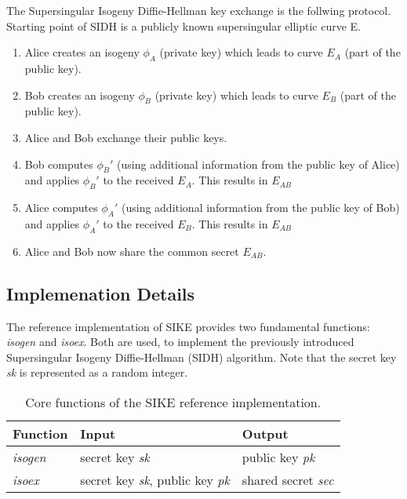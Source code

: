 The Supersingular Isogeny Diffie-Hellman key exchange is the follwing protocol.
Starting point of SIDH is a publicly known supersingular elliptic curve E. 

\begin{enumerate}
\item Alice creates an isogeny $\phi_A$ (private key) which leads to curve $E_A$ (part of the public key).
\item Bob creates an isogeny $\phi_B$ (private key) which leads to curve $E_B$ (part of the public key).
\item Alice and Bob exchange their public keys.
\item Bob computes $\phi_B'$ (using additional information from the public key of Alice) and applies $\phi_B'$ to the received $E_A$. This results in $E_{AB}$
\item Alice computes $\phi_A'$ (using additional information from the public key of Bob) and applies $\phi_A'$ to the received $E_B$. This results in $E_{AB}$
\item Alice and Bob now share the  common secret $E_{AB}$.
\end{enumerate}

\subsection{Implemenation Details}

The reference implementation of SIKE \parencite{sike2020spec} provides two fundamental functions: \textit{isogen} and \textit{isoex}. Both are used, to implement the previously introduced Supersingular Isogeny Diffie-Hellman (SIDH) algorithm. Note that the secret key \textit{sk} is represented as a random integer.
\\

\begin{table}[H]
  \centering
  \begin{tabular}{|K{3cm}|K{3cm}|K{4cm}|}
	\hline
      \textbf{Function} & \textbf{Input} & \textbf{Output} \\
	\hline
      \textit{isogen} & secret key \textit{sk} & public key \textit{pk} \\
     \hline
      \textit{isoex} & secret key \textit{sk}, public key \textit{pk} & shared secret \textit{sec}\\
     \hline
  \end{tabular}
   \caption[Core functions of the SIKE reference implementation]{Core functions of the SIKE reference implementation.}\label{tab:sike_core_functions}
\end{table}

